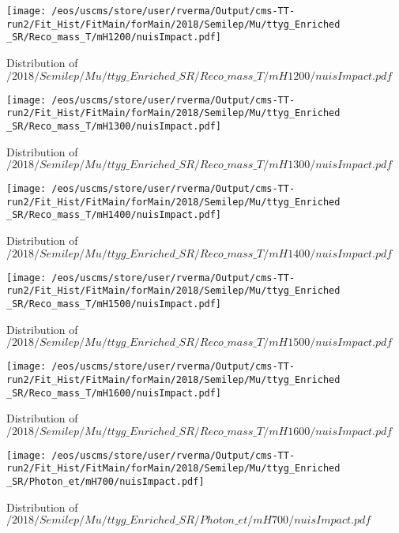 \begin{figure}
\centering
\texttt{[image: /eos/uscms/store/user/rverma/Output/cms-TT-run2/Fit\_Hist/FitMain/forMain/2018/Semilep/Mu/ttyg\_Enriched\_SR/Reco\_mass\_T/mH1200/nuisImpact.pdf]}
\caption{Distribution of $/2018/Semilep/Mu/ttyg\_Enriched\_SR/Reco\_mass\_T/mH1200/nuisImpact.pdf$}
\end{figure}

\begin{figure}
\centering
\texttt{[image: /eos/uscms/store/user/rverma/Output/cms-TT-run2/Fit\_Hist/FitMain/forMain/2018/Semilep/Mu/ttyg\_Enriched\_SR/Reco\_mass\_T/mH1300/nuisImpact.pdf]}
\caption{Distribution of $/2018/Semilep/Mu/ttyg\_Enriched\_SR/Reco\_mass\_T/mH1300/nuisImpact.pdf$}
\end{figure}

\begin{figure}
\centering
\texttt{[image: /eos/uscms/store/user/rverma/Output/cms-TT-run2/Fit\_Hist/FitMain/forMain/2018/Semilep/Mu/ttyg\_Enriched\_SR/Reco\_mass\_T/mH1400/nuisImpact.pdf]}
\caption{Distribution of $/2018/Semilep/Mu/ttyg\_Enriched\_SR/Reco\_mass\_T/mH1400/nuisImpact.pdf$}
\end{figure}

\begin{figure}
\centering
\texttt{[image: /eos/uscms/store/user/rverma/Output/cms-TT-run2/Fit\_Hist/FitMain/forMain/2018/Semilep/Mu/ttyg\_Enriched\_SR/Reco\_mass\_T/mH1500/nuisImpact.pdf]}
\caption{Distribution of $/2018/Semilep/Mu/ttyg\_Enriched\_SR/Reco\_mass\_T/mH1500/nuisImpact.pdf$}
\end{figure}

\begin{figure}
\centering
\texttt{[image: /eos/uscms/store/user/rverma/Output/cms-TT-run2/Fit\_Hist/FitMain/forMain/2018/Semilep/Mu/ttyg\_Enriched\_SR/Reco\_mass\_T/mH1600/nuisImpact.pdf]}
\caption{Distribution of $/2018/Semilep/Mu/ttyg\_Enriched\_SR/Reco\_mass\_T/mH1600/nuisImpact.pdf$}
\end{figure}

\begin{figure}
\centering
\texttt{[image: /eos/uscms/store/user/rverma/Output/cms-TT-run2/Fit\_Hist/FitMain/forMain/2018/Semilep/Mu/ttyg\_Enriched\_SR/Photon\_et/mH700/nuisImpact.pdf]}
\caption{Distribution of $/2018/Semilep/Mu/ttyg\_Enriched\_SR/Photon\_et/mH700/nuisImpact.pdf$}
\end{figure}

